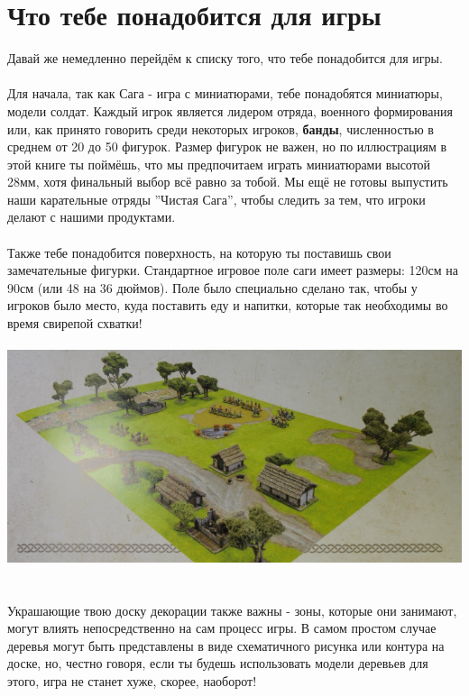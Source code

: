 \documentclass[a4paper,11pt,twoside]{article}
\begin{document}
\section*{Что тебе понадобится для игры}
Давай же немедленно перейдём к списку того, что тебе понадобится для игры. \\ \\
Для начала, так как Сага - игра с миниатюрами, тебе понадобятся миниатюры, модели солдат. Каждый игрок является лидером отряда, военного формирования или, как принято говорить среди некоторых игроков, \textbf{банды}, численностью в среднем от 20 до 50 фигурок. Размер фигурок не важен, но по иллюстрациям в этой книге ты поймёшь, что мы предпочитаем играть миниатюрами высотой 28мм, хотя финальный выбор всё равно за тобой. Мы ещё не готовы выпустить наши карательные отряды ''Чистая Сага'', чтобы следить за тем, что игроки делают с нашими продуктами. \\ \\
Также тебе понадобится поверхность, на которую ты поставишь свои замечательные фигурки. Стандартное игровое поле саги имеет размеры: 120см на 90см (или 48 на 36 дюймов). Поле было специально сделано так, чтобы у игроков было место, куда поставить еду и напитки, которые так необходимы во время свирепой схватки! \\ \\
\includegraphics[width=1.0\textwidth]{pics/SagaBoard} \\ \\ \\
Украшающие твою доску декорации также важны - зоны, которые они занимают, могут влиять непосредственно на сам процесс игры. В самом простом случае деревья могут быть представлены в виде схематичного рисунка или контура на доске, но, честно говоря, если ты будешь использовать модели деревьев для этого, игра не станет хуже, скорее, наоборот! \\ \\
\end{document}
